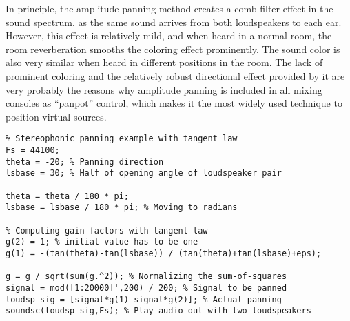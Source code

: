 \documentclass[10pt,a4paper,oneside]{article}
\begin{document}
In principle, the amplitude-panning method creates a comb-filter effect in the sound spectrum, as the same sound arrives from both loudspeakers to each ear. However, this effect is relatively mild, and when heard in a normal room, the room reverberation smooths the coloring effect prominently. The sound color is also very similar when heard in different positions in the room. The lack of prominent coloring and the relatively robust directional effect provided by it are very probably the reasons why amplitude panning is included in all mixing consoles as “panpot” control, which makes it the most widely used technique to position virtual sources.

\begin{lstlisting}
% Stereophonic panning example with tangent law
Fs = 44100;
theta = -20; % Panning direction
lsbase = 30; % Half of opening angle of loudspeaker pair

theta = theta / 180 * pi;
lsbase = lsbase / 180 * pi; % Moving to radians

% Computing gain factors with tangent law
g(2) = 1; % initial value has to be one
g(1) = -(tan(theta)-tan(lsbase)) / (tan(theta)+tan(lsbase)+eps);

g = g / sqrt(sum(g.^2)); % Normalizing the sum-of-squares
signal = mod([1:20000]',200) / 200; % Signal to be panned
loudsp_sig = [signal*g(1) signal*g(2)]; % Actual panning
soundsc(loudsp_sig,Fs); % Play audio out with two loudspeakers


\end{lstlisting}
\end{document}

